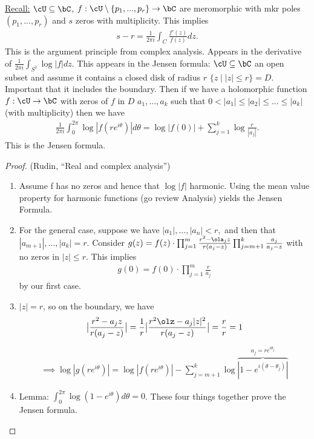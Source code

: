 \bigskip

\underline{Recall:} $\cU \subseteq \bC$, $f:\cU \setminus \{p_1,...,p_r\}\to \bC$ are meromorphic with mkr poles $(p_1,...,p_r)$ and $s$ zeros with multiplicity. This implies
\begin{align*}
  s - r = \frac{1}{2\pi i} \int_C \frac{f'(z)}{f(z)}dz.
\end{align*}
This is the argument principle from complex analysis. Appears in the derivative of $\frac{1}{2\pi i} \int_{S^1} \log |f| dz$. This appears in the Jensen formula: $\cU \subseteq \bC$ an open subset and assume it contains a closed disk of radius $r$ $\{z \mid |z| \leq r\} = D$. Important that it includes the boundary. Then if we have a holomorphic function $f:\cU \to \bC$ with zeros of $f$ in $D$ $a_1,...,a_k$ such that $0 < |a_1| \leq |a_2| \leq ... \leq |a_k|$ (with multiplicity) then we have
\begin{align*}
  \frac{1}{2\pi i} \int_0^{2\pi} \log | f(re^{i\theta})| d\theta = \log |f(0)| + \sum_{j=1}^k \log \frac{r}{|a_j|}.
\end{align*}
This is the Jensen formula. 

\begin{proof}(Rudin, ``Real and complex analysis'')
  \begin{enumerate}[(1)]
    \item Assume f has no zeros and hence that $\log |f|$ harmonic. Using the mean value property for harmonic functions (go review Analysis) yields the Jensen Formula.
    \item For the general case, suppose we have $|a_1|,...,|a_n| < r,$ and then that $|a_{m+1}|,...,|a_k| = r.$ Consider $g(z) = f(z) \cdot \prod_{j=1}^m \frac{r^2 - \ola_jz}{r(a_j - z)}\prod^k_{j=m+1}\frac{a_j}{a_j-z}$ with no zeros in $|z|\leq r$. This implies 
      \begin{align*}
        g(0) = f(0) \cdot \prod_{j=1}^m \frac{r}{a_j}
      \end{align*}
      by our first case.
    \item $|z| = r$, so on the boundary, we have
      \begin{align*}
      \big| \frac{r^2 - a_jz}{r(a_j - z)}\big| = \frac{1}{r} \big|\frac{r^2\olz - a_j|z|^2}{r(a_j - z)}\big| = \frac{r}{r} = 1
      \end{align*}
      \begin{align*}
      \implies \log|g(re^{i\theta})| = \log |f(re^{i\theta})| - \sum_{j=m+1}^k \log \overbrace{|1 - e^{i(\theta - \theta_j)}|}^{a_j = re^{i\theta_j}}
      \end{align*}
    \item Lemma: $\int^{2\pi}_0 \log(1 - e^{i\theta})d\theta = 0$. These four things together prove the Jensen formula.
  \end{enumerate}
\end{proof}

